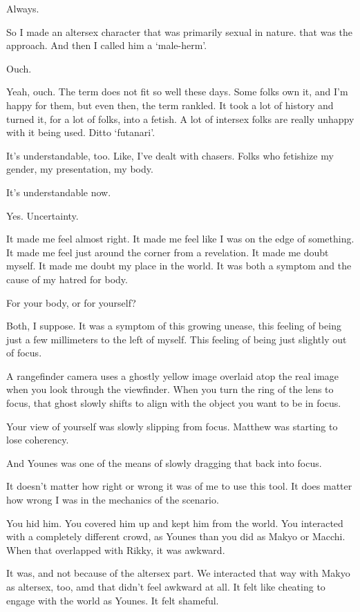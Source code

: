 \begin{ally}
Always.
\end{ally}
So I made an altersex character that was primarily sexual in nature. that was the approach. And then I called him a `male-herm'.

\begin{ally}
Ouch.
\end{ally}
Yeah, ouch. The term does not fit so well these days. Some folks own it, and I'm happy for them, but even then, the term rankled. It took a lot of history and turned it, for a lot of folks, into a fetish. A lot of intersex folks are really unhappy with it being used. Ditto `futanari'.

It's understandable, too. Like, I've dealt with chasers. Folks who fetishize my gender, my presentation, my body.

\begin{ally}
It's understandable now.
\end{ally}
Yes. Uncertainty.

It made me feel almost right. It made me feel like I was on the edge of something. It made me feel just around the corner from a revelation. It made me doubt myself. It made me doubt my place in the world. It was both a symptom and the cause of my hatred for body.

\begin{ally}
For your body, or for yourself?
\end{ally}
Both, I suppose. It was a symptom of this growing unease, this feeling of being just a few millimeters to the left of myself. This feeling of being just slightly out of focus.

A rangefinder camera uses a ghostly yellow image overlaid atop the real image when you look through the viewfinder. When you turn the ring of the lens to focus, that ghost slowly shifts to align with the object you want to be in focus.

\begin{ally}
Your view of yourself was slowly slipping from focus. Matthew was starting to lose coherency.
\end{ally}
And Younes was one of the means of slowly dragging that back into focus.

It doesn't matter how right or wrong it was of me to use this tool. It does matter how wrong I was in the mechanics of the scenario.

\begin{ally}
You hid him. You covered him up and kept him from the world. You interacted with a completely different crowd, as Younes than you did as Makyo or Macchi. When that overlapped with Rikky, it was awkward.
\end{ally}
It was, and not because of the altersex part. We interacted that way with Makyo as altersex, too, amd that didn't feel awkward at all. It felt like cheating to engage with the world as Younes. It felt shameful.

